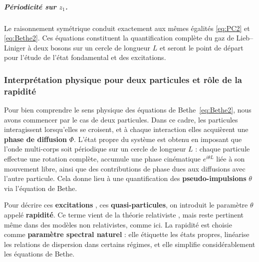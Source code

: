 \subparagraph{Périodicité sur $z_{1}$.}  Le raisonnement symétrique conduit exactement aux mêmes égalités \eqref{eq:PC2} et \eqref{eq:Bethe2}.  Ces équations  constituent la quantification complète du gaz de Lieb–Liniger à deux bosons sur un cercle de longueur $L$ et seront le point de départ pour l’étude de l’état fondamental et des excitations.



\begin{figure}[H]
	\centering
  \label{}	
\end{figure}

\subsubsection{Interprétation physique pour deux particules et rôle de la rapidité}

Pour bien comprendre le sens physique des équations de Bethe~\eqref{eq:Bethe2}, nous avons commencer par le cas de deux particules. Dans ce cadre, les particules interagissent lorsqu'elles se croisent, et à chaque interaction elles acquièrent une {\bf phase de diffusion} $\Phi$. L’état propre du système est obtenu en imposant que l’onde multi-corps soit périodique sur un cercle de longueur $L$ : chaque particule effectue une rotation complète, accumule une phase cinématique $e^{i\theta L}$ liée à son mouvement libre, ainsi que des contributions de phase dues aux diffusions avec l’autre particule. Cela donne lieu à une quantification des {\bf pseudo-impulsions} $\theta$ via l’équation de Bethe.

\medskip

Pour décrire ces {\bf excitations} , ces {\bf quasi-particules}, on introduit le paramètre $\theta$ appelé {\bf rapidité}. Ce terme vient de la théorie relativiste \cite{zamolodchikov1979factorized,babelon2003introduction}, mais reste pertinent même dans des modèles non relativistes, comme ici. La rapidité est choisie comme {\bf paramètre spectral naturel} : elle étiquette les états propres, linéarise les relations de dispersion dans certains régimes, et elle simplifie considérablement les équations de Bethe.

